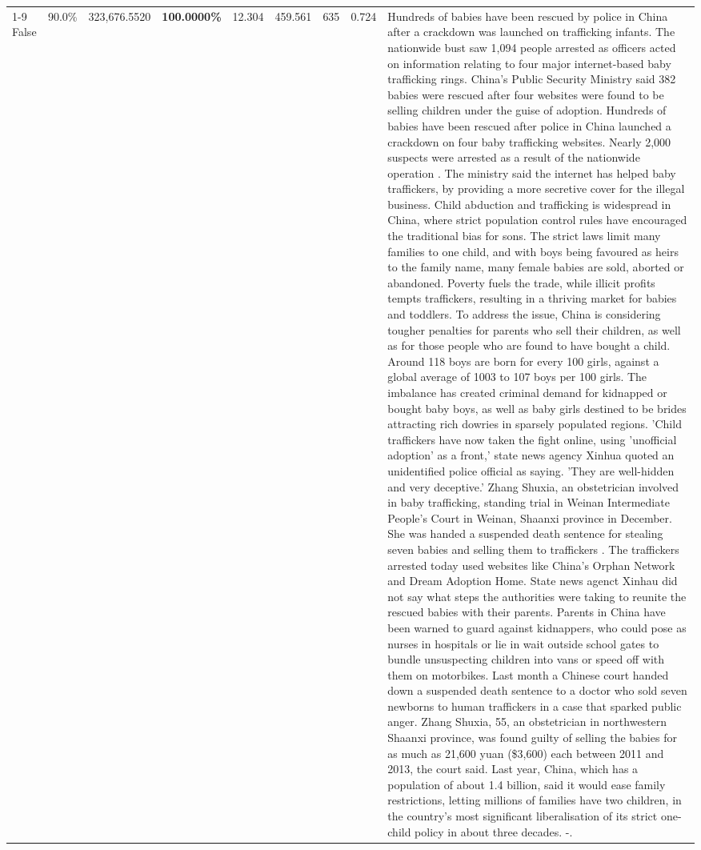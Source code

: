 \begin{table}[H]
\begin{tabular}{lllrlllll}
\cline{1-9}
False & 90.0\% & 323,676.5520 & \bfseries \color{red} 100.0000\% & 12.304 & 459.561 & 635 & 0.724 & Hundreds of babies have been rescued by police in China after a crackdown was launched on trafficking infants. The nationwide bust saw 1,094 people arrested as officers acted on information relating to four major internet-based baby trafficking rings. China's Public Security Ministry said 382 babies were rescued after four websites were found to be selling children under the guise of adoption. Hundreds of babies have been rescued after police in China launched a crackdown on four baby trafficking websites. Nearly 2,000 suspects were arrested as a result of the nationwide operation . The ministry said the internet has helped baby traffickers, by providing a more secretive cover for the illegal business. Child abduction and trafficking is widespread in China, where strict population control rules have encouraged the traditional bias for sons. The strict laws limit many families to one child, and with boys being favoured as heirs to the family name, many female babies are sold, aborted or abandoned. Poverty fuels the trade, while illicit profits tempts traffickers, resulting in a thriving market for babies and toddlers. To address the issue, China is considering tougher penalties for parents who sell their children, as well as for those people who are found to have bought a child. Around 118 boys are born for every 100 girls, against a global average of 1003 to 107 boys per 100 girls. The imbalance has created criminal demand for kidnapped or bought baby boys, as well as baby girls destined to be brides attracting rich dowries in sparsely populated regions. 'Child traffickers have now taken the fight online, using 'unofficial adoption' as a front,' state news agency Xinhua quoted an unidentified police official as saying. 'They are well-hidden and very deceptive.' Zhang Shuxia, an obstetrician involved in baby trafficking, standing trial in Weinan Intermediate People's Court in Weinan, Shaanxi province in December. She was handed a suspended death sentence for stealing seven babies and selling them to traffickers . The traffickers arrested today used websites like China's Orphan Network and Dream Adoption Home. State news agenct Xinhau did not say what steps the authorities were taking to reunite the rescued babies with their parents. Parents in China have been warned to guard against kidnappers, who could pose as nurses in hospitals or lie in wait outside school gates to bundle unsuspecting children into vans or speed off with them on motorbikes. Last month a Chinese court handed down a suspended death sentence to a doctor who sold seven newborns to human traffickers in a case that sparked public anger. Zhang Shuxia, 55, an obstetrician in northwestern Shaanxi province, was found guilty of selling the babies for as much as 21,600 yuan (\$3,600) each between 2011 and 2013, the court said. Last year, China, which has a population of about 1.4 billion, said it would ease family restrictions, letting millions of families have two children, in the country's most significant liberalisation of its strict one-child policy in about three decades. -. \\

\end{tabular}
\end{table}
